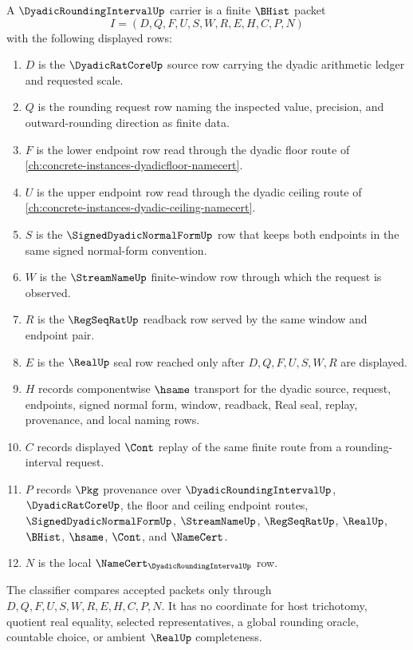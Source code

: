 \begin{definition}
\label{def:dyadic-rounding-interval-carrier}
A $\DyadicRoundingIntervalUp$ carrier is a finite $\BHist$ packet
$$
I=(D,Q,F,U,S,W,R,E,H,C,P,N)
$$
with the following displayed rows:
\begin{enumerate}
\item $D$ is the $\DyadicRatCoreUp$ source row carrying the dyadic arithmetic ledger and requested scale.
\item $Q$ is the rounding request row naming the inspected value, precision, and outward-rounding direction as finite data.
\item $F$ is the lower endpoint row read through the dyadic floor route of \autoref{ch:concrete-instances-dyadicfloor-namecert}.
\item $U$ is the upper endpoint row read through the dyadic ceiling route of \autoref{ch:concrete-instances-dyadic-ceiling-namecert}.
\item $S$ is the $\SignedDyadicNormalFormUp$ row that keeps both endpoints in the same signed normal-form convention.
\item $W$ is the $\StreamNameUp$ finite-window row through which the request is observed.
\item $R$ is the $\RegSeqRatUp$ readback row served by the same window and endpoint pair.
\item $E$ is the $\RealUp$ seal row reached only after $D,Q,F,U,S,W,R$ are displayed.
\item $H$ records componentwise $\hsame$ transport for the dyadic source, request, endpoints, signed normal form, window, readback, Real seal, replay, provenance, and local naming rows.
\item $C$ records displayed $\Cont$ replay of the same finite route from a rounding-interval request.
\item $P$ records $\Pkg$ provenance over $\DyadicRoundingIntervalUp$, $\DyadicRatCoreUp$, the floor and ceiling endpoint routes, $\SignedDyadicNormalFormUp$, $\StreamNameUp$, $\RegSeqRatUp$, $\RealUp$, $\BHist$, $\hsame$, $\Cont$, and $\NameCert$.
\item $N$ is the local $\NameCert_{\DyadicRoundingIntervalUp}$ row.
\end{enumerate}
The classifier compares accepted packets only through $D,Q,F,U,S,W,R,E,H,C,P,N$. It has no coordinate for host trichotomy, quotient real equality, selected representatives, a global rounding oracle, countable choice, or ambient $\RealUp$ completeness.
\end{definition}

